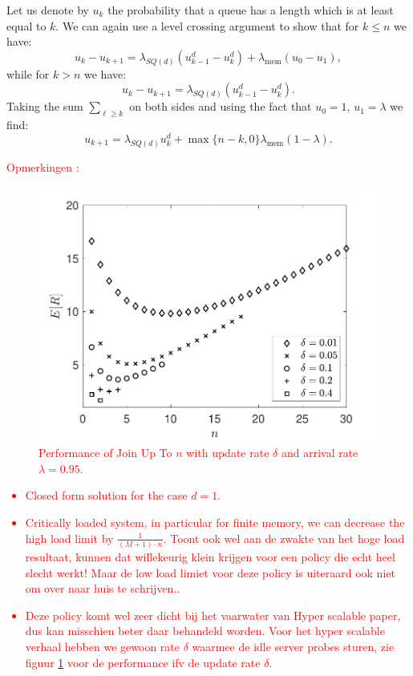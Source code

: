 \documentclass[12pt]{report}
\begin{document}
Let us denote by $u_k$ the probability that a queue has a length which is at least equal to $k$. We can again use a level crossing argument to show that for $k \leq n$ we have:
$$
u_k - u_{k+1} = \lambda_{SQ(d)} (u_{k-1}^d - u_k^d) + \lambda_{\mbox{mem}} (u_0 - u_1),
$$
while for $k > n$ we have:
$$
u_k - u_{k+1} = \lambda_{SQ(d)} (u_{k-1}^d - u_k^d).
$$
Taking the sum $\sum_{\ell \geq k}$ on both sides and using the fact that $u_0 = 1$, $u_1 = \lambda$ we find:
$$
u_{k+1} = \lambda_{SQ(d)} u_k^d + \max \{n-k, 0\} \lambda_{\mbox{mem}} (1-\lambda).
$$
\textcolor{red}{
Opmerkingen :
\begin{figure}
\begin{center}
\includegraphics[scale=0.6]{figures/Chapter8/join_up_to_n.pdf}
\end{center}
\caption{Performance of Join Up To $n$ with update rate $\delta$ and arrival rate $\lambda=0.95$.} \label{fig:join_up_to_n}
\end{figure}
\begin{itemize}
\item Closed form solution for the case $d=1$.
\item Critically loaded system, in particular for finite memory, we can decrease the high load limit by $\frac{1}{(M+1)\cdot n}$. Toont ook wel aan de zwakte van het hoge load resultaat, kunnen dat willekeurig klein krijgen voor een policy die echt heel slecht werkt! Maar de low load limiet voor deze policy is uiteraard ook niet om over naar huis te schrijven..
\item Deze policy komt wel zeer dicht bij het vaarwater van Hyper scalable paper, dus kan misschien beter daar behandeld worden. Voor het hyper scalable verhaal hebben we gewoon rate $\delta$ waarmee de idle server probes sturen, zie figuur \ref{fig:join_up_to_n} voor de performance ifv de update rate $\delta$.
\end{itemize}
}
\end{document}
